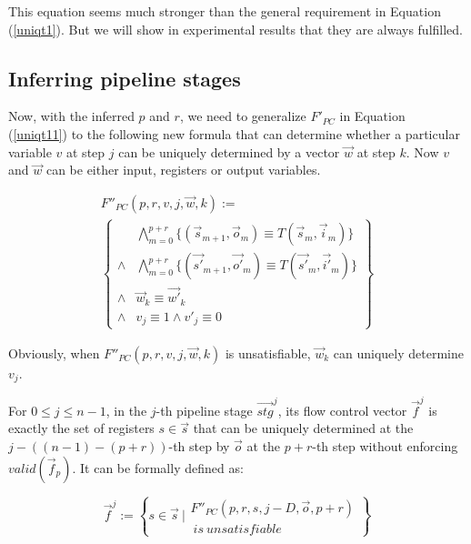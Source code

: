 \documentclass[conference]{IEEEtran}
\begin{document}
This equation seems much stronger than the general requirement in Equation (\ref{uniqt1}).
But we will show in experimental results that 
they are always fulfilled.



\subsection{Inferring pipeline stages}\label{subsec_inferstage}

Now,
with the inferred $p$ and $r$,
we need to generalize $F'_{PC}$ in Equation (\ref{uniqt11}) to the following new formula that
can determine whether a particular variable $v$ at step $j$
can be uniquely determined by a vector $\vec{w}$ at step $k$.
Now $v$ and $\vec{w}$ can be either input, registers or output variables.

\begin{multline}\label{uniqt2}
F''_{PC}(p,r,v,j,\vec{w},k):=\\
\left\{
\begin{array}{cc}
&\bigwedge_{m=0}^{p+r}
\{
(\vec{s}_{m+1},\vec{o}_m)\equiv T(\vec{s}_m,\vec{i}_m)
\}
\\
\wedge&\bigwedge_{m=0}^{p+r}
\{
(\vec{s'}_{m+1},\vec{o'}_m)\equiv T(\vec{s'}_m,\vec{i'}_m)
\}
\\
\wedge&\vec{w}_{k}\equiv \vec{w'}_{k} \\
\wedge& v_{j}\equiv 1 \wedge  v'_{j}\equiv 0 
\end{array}
\right\}
\end{multline}

Obviously,
when $F''_{PC}(p,r,v,j,\vec{w},k)$ is unsatisfiable,
$\vec{w}_k$ can uniquely determine $v_j$.

For $0\le j\le n-1$,
in the $j$-th pipeline stage $\vec{stg}^j$,
its flow control vector $\vec{f}^j$ is exactly the set of registers $s\in \vec{s}$ 
that can be uniquely determined at the $j-((n-1)-(p+r))$-th step by $\vec{o}$ 
at the $p+r$-th step without enforcing $valid(\vec{f}_p)$.
It can be formally defined as:

\begin{equation}\label{stgn_fj}
\vec{f}^{j} := 
 \left\{
 s\in \vec{s} ~| 
\begin{array}{cc}
 F''_{PC}(p,r,s,j-D,\vec{o},p+r)\\
 ~is~unsatisfiable
\end{array}
\right\}
\end{equation}
\end{document}
